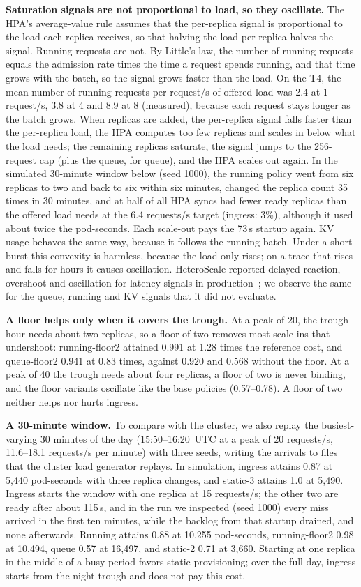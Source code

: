 \documentclass[10pt,conference]{IEEEtran}
\begin{document}
\textbf{Saturation signals are not proportional to load, so they
oscillate.} The HPA's average-value rule assumes that the per-replica signal
is proportional to the load each replica receives, so that halving the load
per replica halves the signal. Running requests are not. By Little's law,
the number of running requests equals the admission rate times the time a
request spends running, and that time grows with the batch, so the signal
grows faster than the load. On the T4, the mean
number of running requests per request/s of offered load was 2.4 at
1 request/s, 3.8 at 4 and 8.9 at 8 (measured), because each request stays
longer as the batch grows. When replicas are added, the per-replica signal
falls faster than the per-replica load, the HPA computes too few replicas and
scales in below what the load needs; the remaining replicas saturate, the
signal jumps to the 256-request cap (plus the queue, for queue), and the HPA
scales out again. In the simulated 30-minute window below (seed 1000), the running
policy went from six replicas to two and back to six within six minutes,
changed the replica count 35 times in 30 minutes, and at half of all HPA syncs had fewer ready
replicas than the offered load needs at the 6.4 requests/s target (ingress:
3\%), although it used about twice the pod-seconds. Each scale-out
pays the 73\,s startup again. KV usage behaves the same way, because it
follows the running batch. Under a short burst this convexity is harmless,
because the load only rises; on a trace that rises and falls for hours it
causes oscillation. HeteroScale reported delayed reaction, overshoot and
oscillation for latency signals in production~\cite{li2025heteroscale}; we
observe the same for the queue, running and KV signals that it did not evaluate.

\textbf{A floor helps only when it covers the trough.} At a peak of 20, the
trough hour needs about two replicas, so a floor of two removes most
scale-ins that undershoot: running-floor2 attained 0.991 at 1.28 times the
reference cost, and queue-floor2 0.941 at 0.83 times, against 0.920 and 0.568
without the floor. At a peak of 40 the trough needs about four replicas, a
floor of two is never binding, and the floor variants oscillate like the
base policies (0.57--0.78). A floor of two neither helps nor hurts ingress.

\textbf{A 30-minute window.} To compare with the cluster, we also replay the
busiest-varying 30 minutes of the day (15:50--16:20~UTC at a peak of
20 requests/s, 11.6--18.1 requests/s per minute) with three seeds, writing the
arrivals to files that the cluster load generator replays. In simulation,
ingress attains 0.87 at 5{,}440 pod-seconds with three replica changes, and
static-3 attains 1.0 at 5{,}490. Ingress starts the window with one
replica at 15 requests/s; the other two are ready after about 115\,s, and
in the run we inspected (seed 1000) every miss arrived in the first ten
minutes, while the backlog from that startup drained, and none afterwards. Running attains 0.88 at 10{,}255
pod-seconds, running-floor2 0.98 at 10{,}494, queue 0.57 at 16{,}497, and
static-2 0.71 at 3{,}660. Starting at one replica in the middle of a busy
period favors static provisioning; over the full day, ingress starts from the
night trough and does not pay this cost.
\end{document}

